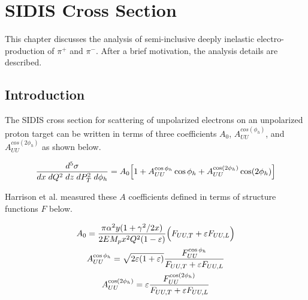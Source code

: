 %
%
%
%
 

\chapter{SIDIS Cross Section}
This chapter discusses the analysis of semi-inclusive deeply inelastic electro-production of $\pi^+$ and $\pi^-$.  After a brief motivation, the analysis details are described.  

\section{Introduction}
The SIDIS cross section for scattering of unpolarized electrons on an unpolarized proton target can be written in terms of three coefficients $A_{0}$, $A_{UU}^{cos(\phi_h)}$, and $A_{UU}^{cos(2\phi_h)}$ as shown below.  

\begin{equation}
	\frac{d^5\sigma}{dx \; dQ^2 \; dz \; dP_T^2 \; d\phi_h} = A_{0} \Bigl[ 1 + A_{UU}^{\cos\phi_h} \cos\phi_h + A_{UU}^{\cos(2\phi_h)} \cos(2\phi_h) \Bigr]
\end{equation}

Harrison et al. measured these $A$ coefficients defined in terms of structure functions $F$ below.  

\begin{gather}
	\label{eqn:a-coefficients}
	A_{0} = \frac{\pi \alpha^2 y (1+\gamma^2/2x)}{2 E M_p x^2 Q^2 (1-\varepsilon)} \Bigl( F_{UU,T} + \varepsilon F_{UU,L} \Bigr) \\
	A_{UU}^{\cos\phi_h} = \sqrt{2\varepsilon(1+\varepsilon)} \frac{F_{UU}^{\cos\phi_h}}{F_{UU,T} + \varepsilon F_{UU,L}} \\
	A_{UU}^{\cos(2\phi_h)} = \varepsilon \frac{F_{UU}^{\cos(2\phi_h)}}{F_{UU,T} + \varepsilon F_{UU,L}}
\end{gather}

